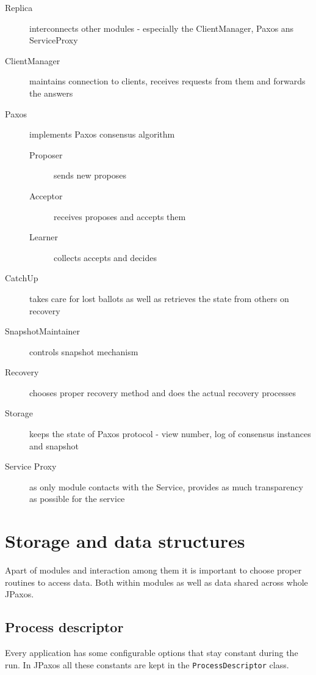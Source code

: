 \begin{description}
  \item[Replica ] interconnects other modules - especially the ClientManager, Paxos ans ServiceProxy
  \item[ClientManager ] maintains connection to clients, receives requests from them and forwards the answers
  \item[Paxos ] implements Paxos consensus algorithm
  \begin{description}
    \item[Proposer ] sends new proposes
    \item[Acceptor ] receives proposes and accepts them
    \item[Learner ] collects accepts and decides
  \end{description}
  \item[CatchUp ] takes care for lost ballots as well as retrieves the state from others on recovery
  \item[SnapshotMaintainer ] controls snapshot mechanism
  \item[Recovery ] chooses proper recovery method and does the actual recovery processes
  \item[Storage ] keeps the state of Paxos protocol - view number, log of consensus instances and snapshot
  \item[Service Proxy ] as only module contacts with the Service, provides as much transparency as possible for the service
\end{description}

\section{Storage and data structures}
\label{sec:storage_and_data_structures}

Apart of modules and interaction among them it is important to choose proper routines to access data. Both within modules as well as data shared across whole JPaxos.

\subsection{Process descriptor}

Every application has some configurable options that stay constant during the run. In JPaxos all these constants are kept in the \texttt{ProcessDescriptor} class.

